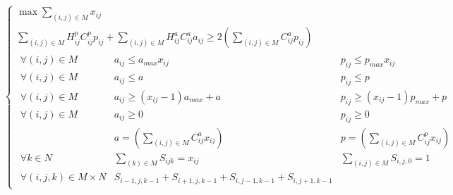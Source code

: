 \documentclass[a4paper,11pt] {article}
\begin{document}
\begin{equation}
\left\{
\begin{array}{l}
\max \sum\limits_{(i,j)\in M} x_{ij}\\
\sum\limits_{(i,j)\in M} H^p_{ij}C^p_{ij}p_{ij} + \sum\limits_{(i,j)\in M} H^a_{ij}C^a_{ij}a_{ij} \geq 2(\sum\limits_{(i,j)\in M} C^a_{ij}p_{ij})\\
	\begin{array}{lll}
		\forall{(i,j)} \in M&a_{ij}\leq a_{max}x_{ij}&p_{ij}\leq p_{max}x_{ij}\\
		\forall{(i,j)} \in M&a_{ij}\leq a&p_{ij}\leq p\\
		\forall{(i,j)} \in M&a_{ij}\geq (x_{ij}-1)a_{max}+a&p_{ij}\geq (x_{ij}-1)p_{max}+p\\
		\forall{(i,j)} \in M&a_{ij} \geq 0&p_{ij} \geq 0\\
		&a = (\sum\limits_{(i,j)\in M} C^a_{ij}x_{ij})&p = (\sum\limits_{(i,j)\in M} C^p_{ij}x_{ij})\\
		\forall{k} \in N&\sum\limits_{(k)\in M} S_{ijk} = x_{ij}&\sum\limits_{(i,j)\in M} S_{i,j,0} = 1\\
		\forall{(i,j,k)} \in M \times N&S_{i-1,j,k-1} + S_{i+1,j,k-1} + S_{i,j-1,k-1} + S_{i,j+1,k-1}
	\end{array}
	
\end{array}
\right.
\end{equation}
\end{document}

